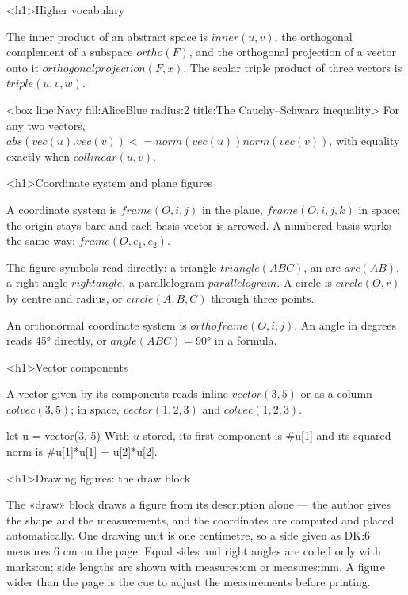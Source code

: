 \documentclass[
  margins=8,
  font=Latin Modern Roman,
  size=12,
  linespread=1.4,
  lang=en
]{scholatex}
\begin{document}
<h1>Higher vocabulary

The inner product of an abstract space is $inner(u, v)$, the orthogonal
complement of a subspace $ortho(F)$, and the orthogonal projection of a
vector onto it $orthogonalprojection(F, x)$. The scalar triple product of
three vectors is $triple(u, v, w)$.

<box line:Navy fill:AliceBlue radius:2 title:{The Cauchy–Schwarz inequality}>{
For any two vectors, $abs(vec(u) . vec(v)) <= norm(vec(u)) norm(vec(v))$,
with equality exactly when $collinear(u, v)$.
}

<h1>Coordinate system and plane figures

A coordinate system is $frame(O, i, j)$ in the plane, $frame(O, i, j, k)$
in space; the origin stays bare and each basis vector is arrowed. A
numbered basis works the same way: $frame(O, e_1, e_2)$.

The figure symbols read directly: a triangle $triangle(ABC)$, an arc
$arc(AB)$, a right angle $rightangle$, a parallelogram $parallelogram$.
A circle is $circle(O, r)$ by centre and radius, or $circle(A, B, C)$
through three points.

An orthonormal coordinate system is $orthoframe(O, i, j)$. An angle in
degrees reads 45° directly, or $angle(ABC) = 90°$ in a formula.

<h1>Vector components

A vector given by its components reads inline $vector(3, 5)$ or as a
column $colvec(3, 5)$; in space, $vector(1, 2, 3)$ and $colvec(1, 2, 3)$.

let u = vector(3, 5)
With $u$ stored, its first component is #{u[1]} and its squared norm is
#{u[1]*u[1] + u[2]*u[2]}.

<h1>Drawing figures: the draw block

The «draw» block draws a figure from its description alone — the author
gives the shape and the measurements, and the coordinates are computed and
placed automatically. One drawing unit is one centimetre, so a side given as
DK:6 measures 6 cm on the page. Equal sides and right angles are coded only
with marks:on; side lengths are shown with measures:cm or measures:mm. A
figure wider than the page is the cue to adjust the measurements before
printing.
\end{document}
